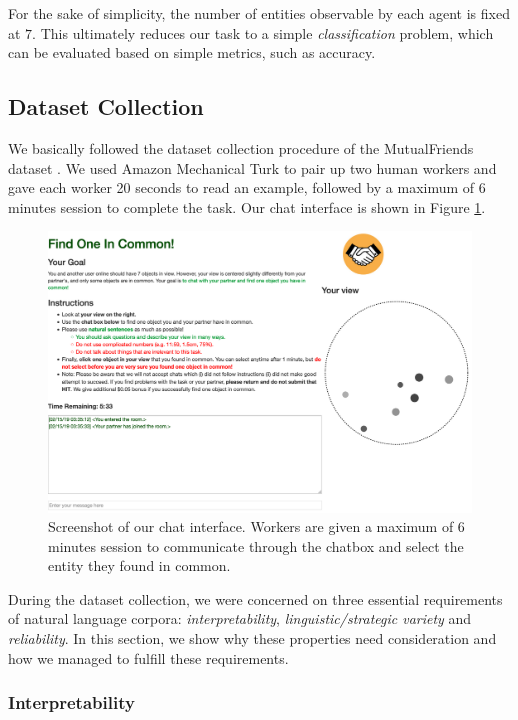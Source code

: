 \documentclass[letterpaper]{article} %
\begin{document}
For the sake of simplicity, the number of entities observable by each agent is fixed at $7$. This ultimately reduces our task to a simple \textit{classification} problem, which can be evaluated based on simple metrics, such as accuracy.

\subsection{Dataset Collection}

We basically followed the dataset collection procedure of the MutualFriends dataset \cite{he2017learning}. We used Amazon Mechanical Turk to pair up two human workers and gave each worker 20 seconds to read an example, followed by a maximum of 6 minutes session to complete the task. Our chat interface is shown in Figure \ref{fig:annotation}.

\begin{figure}[ht]
\centering
\includegraphics[width=0.97\columnwidth]{annotation.png}
\caption{
Screenshot of our chat interface. Workers are given a maximum of 6 minutes session to communicate through the chatbox and select the entity they found in common.
}
\label{fig:annotation}
\end{figure}

During the dataset collection, we were concerned on three essential requirements of natural language corpora: \emph{interpretability}, \emph{linguistic/strategic variety} and \emph{reliability}. In this section, we show why these properties need consideration and how we managed to fulfill these requirements.

\subsubsection{Interpretability}
\end{document}
